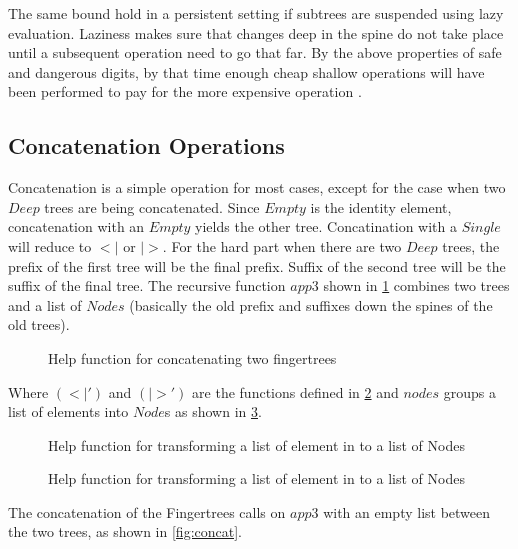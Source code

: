 The same bound hold in a persistent setting if subtrees are suspended using lazy
evaluation. Laziness makes sure that changes deep in the spine do not take place
until a subsequent operation need to go that far. By the above properties
of safe and dangerous digits, by that time enough cheap shallow operations
will have been performed to pay for the more expensive operation
\cite{fingertree}.

\subsection{Concatenation Operations}
Concatenation is a simple operation for most cases, except for the case when two
$Deep$ trees are being concatenated. Since $Empty$ is the identity element,
concatenation with an $Empty$ yields the other tree. Concatination with a
$Single$ will reduce to $<|$ or $|>$. For the hard part when there are two
$Deep$ trees, the prefix of the first tree will be the final prefix. Suffix of
the second tree will be the suffix of the final tree. The recursive function
$app3$ shown in \cref{fig:concatHelp} combines two trees and a list of $Nodes$
(basically the old prefix and suffixes down the spines of the old trees).

\begin{figure}[h!]

\caption{Help function for concatenating two fingertrees \label{fig:concatHelp}}
\end{figure}

Where $(<|')$ and $(|>')$ are the functions defined in \cref{fig:reduceAppend}
and $nodes$ groups a list of elements into $Node$s as shown in
\cref{fig:nodesHelp}. 

\begin{figure}[h!]

\caption{Help function for transforming a list of element in to a list of Nodes \label{fig:reduceAppend}}
\end{figure}


\begin{figure}[h!]

\caption{Help function for transforming a list of element in to a list of Nodes \label{fig:nodesHelp}}
\end{figure}

The concatenation of the Fingertrees calls on $app3$ with an empty list
between the two trees, as shown in \cref{fig:concat}.

